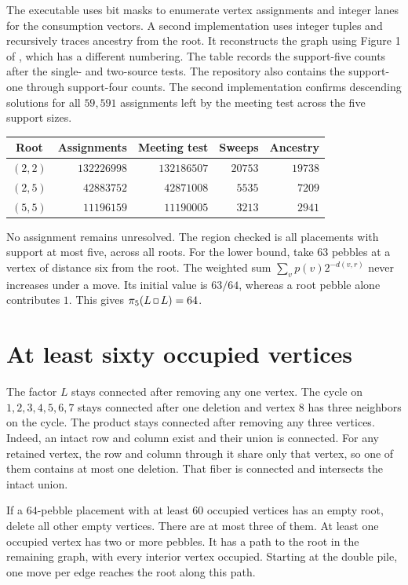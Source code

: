 \documentclass[10pt]{article}
\newcommand{\sq}{\mathbin{\vcenter{\hbox{\setlength{\fboxsep}{0.6pt}%
  \fbox{\rule{0pt}{2.4pt}\rule{2.4pt}{0pt}}}}}}
\begin{document}
The executable uses bit masks to enumerate vertex assignments and
integer lanes for the consumption vectors. A second implementation
uses integer tuples and recursively traces ancestry from the root.
It reconstructs the graph using Figure 1 of \cite{flocco}, which
has a different numbering. The table records the support-five
counts after the single- and two-source tests. The repository also
contains the support-one through support-four counts. The second
implementation confirms descending solutions for all $59{,}591$
assignments left by the meeting test across the five support sizes.

\begin{center}
\begin{tabular}{c|r|r|r|r}
Root & Assignments & Meeting test & Sweeps & Ancestry\\
\hline
$(2,2)$ & $132226998$ & $132186507$ & $20753$ & $19738$\\
$(2,5)$ &  $42883752$ &  $42871008$ &  $5535$ &  $7209$\\
$(5,5)$ &  $11196159$ &  $11190005$ &  $3213$ &  $2941$
\end{tabular}
\end{center}

No assignment remains unresolved. The region checked is all
placements with support at most five, across all roots.
For the lower bound, take $63$ pebbles at a vertex of distance six
from the root. The weighted sum $\sum_v p(v)2^{-d(v,r)}$ never
increases under a move. Its initial value is $63/64$, whereas a
root pebble alone contributes $1$. This gives $\pi_5(L\sq L)=64$.

\section{At least sixty occupied vertices}

The factor $L$ stays connected after removing any one vertex. The
cycle on $1,2,3,4,5,6,7$ stays connected after one deletion and
vertex $8$ has three neighbors on the cycle.
The product stays connected after removing any three vertices.
Indeed, an intact row and column exist and their union is connected.
For any retained vertex, the row and column through it share only
that vertex, so one of them contains at most one deletion. That
fiber is connected and intersects the intact union.

If a $64$-pebble placement with at least $60$ occupied vertices
has an empty root, delete all other empty vertices. There are at
most three of them. At least one occupied vertex has two or more
pebbles. It has a path to the root in the remaining graph, with
every interior vertex occupied. Starting at the double pile, one
move per edge reaches the root along this path.
\end{document}
